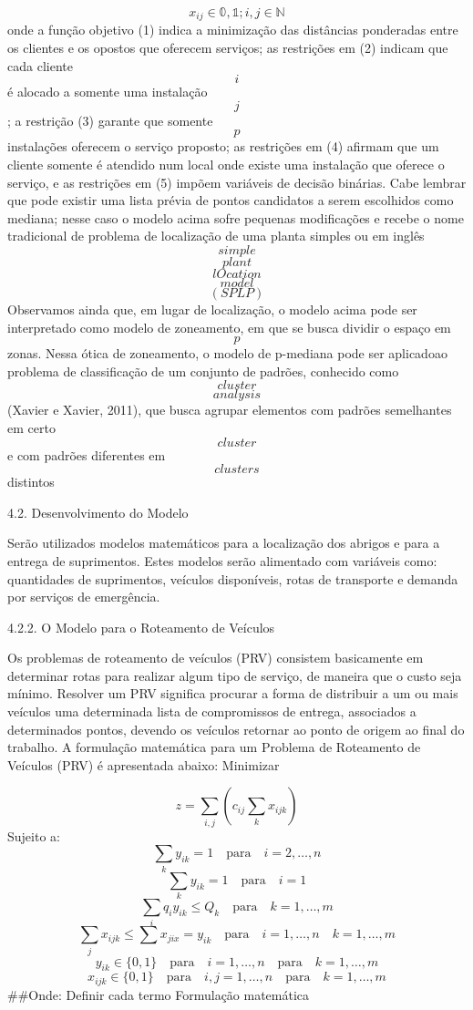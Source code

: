 \documentclass[
]{article}
\begin{document}
\[
x_{ij} \in \mathbb{0,1}; i,j \in \mathbb{N}
\] onde a função objetivo (1) indica a minimização das distâncias
ponderadas entre os clientes e os opostos que oferecem serviços; as
restrições em (2) indicam que cada cliente \[i\] é alocado a somente uma
instalação \[j\] ; a restrição (3) garante que somente \[
p
\] instalações oferecem o serviço proposto; as restrições em (4) afirmam
que um cliente somente é atendido num local onde existe uma instalação
que oferece o serviço, e as restrições em (5) impõem variáveis de
decisão binárias. Cabe lembrar que pode existir uma lista prévia de
pontos candidatos a serem escolhidos como mediana; nesse caso o modelo
acima sofre pequenas modificações e recebe o nome tradicional de
problema de localização de uma planta simples ou em inglês \[ simple \]
\[ plant \] \[ lOcation \] \[ model \] \[(SPLP)\] Observamos ainda que,
em lugar de localização, o modelo acima pode ser interpretado como
modelo de zoneamento, em que se busca dividir o espaço em \[
p\] zonas. Nessa ótica de zoneamento, o modelo de p-mediana pode ser
aplicadoao problema de classificação de um conjunto de padrões,
conhecido como \[cluster\] \[analysis\] (Xavier e Xavier, 2011), que
busca agrupar elementos com padrões semelhantes em certo \[ cluster \] e
com padrões diferentes em \[ clusters \] distintos

4.2. Desenvolvimento do Modelo

Serão utilizados modelos matemáticos para a localização dos abrigos e
para a entrega de suprimentos. Estes modelos serão alimentado com
variáveis como: quantidades de suprimentos, veículos disponíveis, rotas
de transporte e demanda por serviços de emergência.

4.2.2. O Modelo para o Roteamento de Veículos

Os problemas de roteamento de veículos (PRV) consistem basicamente em
determinar rotas para realizar algum tipo de serviço, de maneira que o
custo seja mínimo. Resolver um PRV significa procurar a forma de
distribuir a um ou mais veículos uma determinada lista de compromissos
de entrega, associados a determinados pontos, devendo os veículos
retornar ao ponto de origem ao final do trabalho. A formulação
matemática para um Problema de Roteamento de Veículos (PRV) é
apresentada abaixo: Minimizar

\[
z=\sum_{i,j}(c_{ij}\sum_{k}x_{ijk})
\] Sujeito a: \[
\sum_{k}y_{ik}=1 \quad \text{para} \quad  i=2, \dots,n
\] \[
\sum_{k}y_{ik}=1\quad \text{para} \quad  i=1
\] \[
\sum_{i}q_{i}y_{ik} \leq Q_{k} \quad \text{para} \quad  k=1, \dots,m
\] \[
\sum_{j}x_{ijk} \leq\sum x_{jix}=y_{ik} \quad \text{para}\quad i=1,\dots,n\quad k=1,\dots,m
\] \[
y_{ik} \in \{0,1\}\quad\text{para}\quad i=1,\dots,n\quad\text{para}\quad k=1,\dots,m
\] \[
x_{ijk} \in \{0,1\}\quad\text{para}\quad i,j=1,\dots,n\quad\text{para}\quad k=1,\dots,m
\] \#\#Onde: Definir cada termo Formulação matemática
\end{document}
